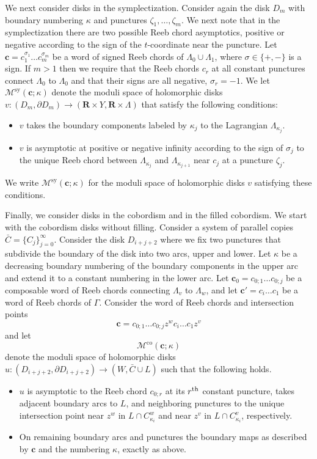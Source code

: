 \documentclass{gtpart}
\renewcommand{\R}{\mathbf{R}}
\renewcommand{\co}{\mathrm{co}}
\newcommand{\sy}{\mathrm{sy}}
\begin{document}
We next consider disks in the symplectization.  
Consider again the disk $D_{m}$ with boundary numbering $\kappa$ and punctures $\zeta_{1},\dots,\zeta_{m}$.  We next note that in the symplectization there are two possible Reeb chord asymptotics, positive or negative according to the sign of the $t$-coordinate near the puncture. Let $\mathbf{c}=c_{1}^{\sigma_{1}}\dots c_{m}^{\sigma_{m}}$ be a word of signed Reeb chords of $\Lambda_{0}\cup \Lambda_1$, where $\sigma\in\{+,-\}$ is a sign. 
If $m>1$ then we require that the Reeb chords $c_{r}$ at all constant punctures connect $\Lambda_{0}$ to $\Lambda_{0}$ and that their signs are all negative, $\sigma_{r}=-1$. We let $\mathcal{M}^{\sy}(\mathbf{c};\kappa)$ denote the moduli space of holomorphic disks $v\colon (D_{m},\partial D_{m})\to (\R\times Y,\R\times \Lambda)$ that satisfy the following conditions:
\begin{itemize}
	\item $v$ takes the boundary components labeled by $\kappa_{j}$ to the Lagrangian $\Lambda_{\kappa_j}$.
	\item $v$ is asymptotic at positive or negative infinity according to the sign of $\sigma_{j}$ to the unique Reeb chord between $\Lambda_{\kappa_j}$ and $\Lambda_{\kappa_{j+1}}$ near $c_{j}$ at a puncture $\zeta_{j}$.  		 
\end{itemize} 
We write $\mathcal{M}^{\sy}(\mathbf{c};\kappa)$ for the moduli space of holomorphic disks $v$ satisfying these conditions.

Finally, we consider disks in the cobordism and in the filled cobordism. We start with the cobordism
disks without filling. Consider a system of parallel copies $\bar C=\{C_{j}\}_{j=0}^{\infty}$.
Consider the disk $D_{i+j+2}$ where we fix two punctures that subdivide the boundary of the disk
into two arcs, upper and lower. Let $\kappa$ be a decreasing boundary numbering of the boundary
components in the upper arc and extend it to a constant numbering in the lower arc. Let
$\mathbf{c}_{0}=c_{0;1}\dots c_{0;j}$ be a composable word of Reeb chords connecting $\Lambda_{v}$
to $\Lambda_{w}$, and let $\mathbf{c}'=c_{i}\dots c_{1}$ be a word of Reeb chords of $\Gamma$. Consider the word of Reeb chords and intersection points 
\[ 
\mathbf{c}=c_{0;1}\dots c_{0;j}z^{w}c_{i}\dots c_{1}z^{v}
\]
and let 
\[ 
\mathcal{M}^{\co}(\mathbf{c};\kappa)
\]
denote the moduli space of holomorphic disks $u\colon (D_{i+j+2},\partial D_{i+j+2})\to (W,\bar C\cup L)$ such that the following holds.
\begin{itemize}
	\item $u$ is asymptotic to the Reeb chord $c_{0;r}$ at its $r^{\rm th}$ constant puncture, takes adjacent boundary arcs to $L$, and neighboring punctures to the unique intersection point near $z^{w}$ in $L\cap C^{w}_{\kappa_{i}}$ and near $z^{v}$ in $L\cap C^{v}_{\kappa_{i}}$, respectively. 
	\item On remaining boundary arcs and punctures the boundary maps as described by $\mathbf{c}$ and the numbering $\kappa$, exactly as above.
\end{itemize}
\end{document}
